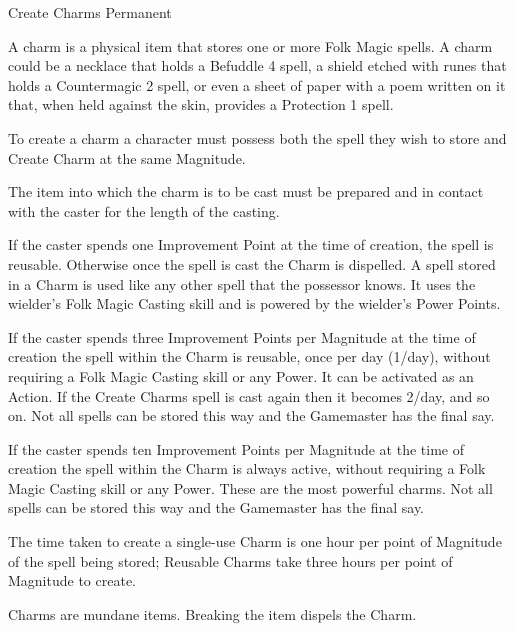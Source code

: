 \begin{rpg-spell}
{Create Charms}
{Permanent}

A charm is a physical item that stores one or more Folk Magic spells. A charm could be a necklace that holds a Befuddle 4 spell, a shield etched with runes that holds a Countermagic 2 spell, or even a sheet of paper with a poem written on it that, when held against the skin, provides a Protection 1 spell.

\begin{rpg-list}
\item To create a charm a character must possess both the spell they wish to store and Create Charm at the same Magnitude.
\item The item into which the charm is to be cast must be prepared and in contact with the caster for the length of the casting.
\item If the caster spends one Improvement Point at the time of creation, the spell is reusable. Otherwise once the spell is cast the Charm is dispelled. A spell stored in a Charm is used like any other spell that the possessor knows. It uses the wielder’s Folk Magic Casting skill and is powered by the wielder’s Power Points.
\item If the caster spends three Improvement Points per Magnitude at the time of creation the spell within the Charm is reusable, once per day (1/day), without requiring a Folk Magic Casting skill or any Power. It can be activated as an Action. If the Create Charms spell is cast again then it becomes 2/day, and so on. Not all spells can be stored this way and the Gamemaster has the final say.
\item If the caster spends ten Improvement Points per Magnitude at the time of creation the spell within the Charm is always active, without requiring a Folk Magic Casting skill or any Power. These are the most powerful charms. Not all spells can be stored this way and the Gamemaster has the final say.
\item The time taken to create a single-use Charm is one hour per point of Magnitude of the spell being stored; Reusable Charms take three hours per point of Magnitude to create.
\item Charms are mundane items. Breaking the item dispels the Charm.
\end{rpg-list}
\end{rpg-spell}


